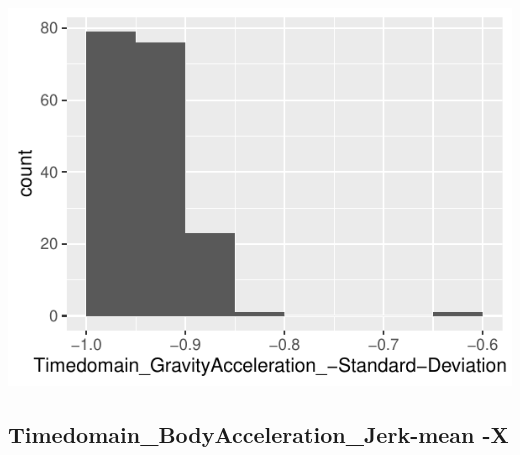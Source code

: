 \documentclass[
]{article}
\begin{document}
\begin{minipage}{0.25 \textwidth}

\includegraphics{codebook_tidydatasub_files/figure-latex/Var-14-Timedomain-GravityAcceleration--Standard-Deviation--Z-1.pdf}

\end{minipage}

\noindent\makebox[\linewidth]{\rule{\textwidth}{0.4pt}}

\hypertarget{timedomain_bodyacceleration_jerk-mean--x}{%
\subsection{Timedomain\_BodyAcceleration\_Jerk-mean
-X}\label{timedomain_bodyacceleration_jerk-mean--x}}
\end{document}
